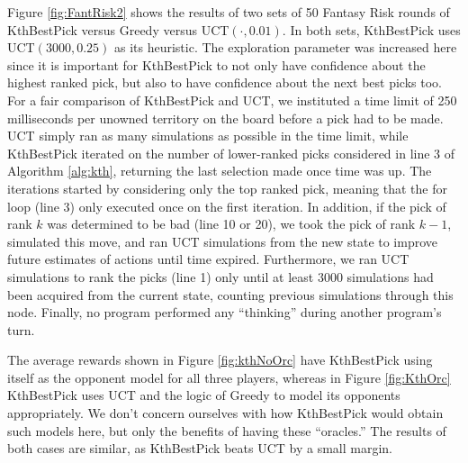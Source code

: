 \documentclass[letterpaper]{article}
\numberwithin{equation}{section}
\numberwithin{theorem}{section}
\numberwithin{lemma}{section}
\numberwithin{df}{section}
\begin{document}
Figure \ref{fig:FantRisk2} shows the results of two sets of 50 Fantasy Risk rounds of KthBestPick versus Greedy versus UCT$(\cdot, 0.01)$.  In both sets, KthBestPick uses UCT$(3000, 0.25)$ as its heuristic.  The exploration parameter was increased here since it is important for KthBestPick to not only have confidence about the highest ranked pick, but also to have confidence about the next best picks too.  For a fair comparison of KthBestPick and UCT, we instituted a time limit of 250 milliseconds per unowned territory on the board before a pick had to be made.  UCT simply ran as many simulations as possible in the time limit, while KthBestPick iterated on the number of lower-ranked picks considered in line 3 of Algorithm \ref{alg:kth}, returning the last selection made once time was up.  The iterations started by considering only the top ranked pick, meaning that the for loop (line 3) only executed once on the first iteration.  In addition, if the pick of rank $k$ was determined to be bad (line 10 or 20), we took the pick of rank $k-1$, simulated this move, and ran UCT simulations from the new state to improve future estimates of actions until time expired.    Furthermore, we ran UCT simulations to rank the picks (line 1) only until at least 3000 simulations had been acquired from the current state, counting previous simulations through this node.  Finally, no program performed any ``thinking'' during another program's turn.

The average rewards shown in Figure \ref{fig:kthNoOrc} have KthBestPick using itself as the opponent model for all three players, whereas in Figure \ref{fig:KthOrc} KthBestPick uses UCT and the logic of Greedy to model its opponents appropriately.  We don't concern ourselves with how KthBestPick would obtain such models here, but only the benefits of having these ``oracles.''  The results of both cases are similar, as KthBestPick beats UCT by a small margin.
\end{document}
